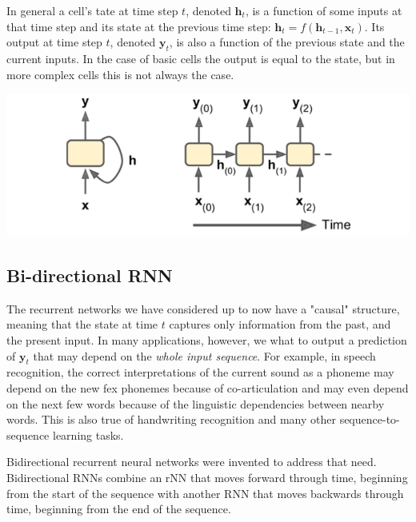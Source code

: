 \documentclass[12pt]{article}
\begin{document}
            In general a cell's tate at time step $t$, denoted $\boldsymbol{h}_t$, is a function of some inputs at that
            time step and its state at the previous time step: $\boldsymbol{h}_t = f(\boldsymbol{h}_{t-1},
            \boldsymbol{x}_t)$. Its output at time step $t$, denoted $\boldsymbol{y}_t$, is also a function of the
            previous state and the current inputs. In the case of basic cells the output is equal to the state, but in
            more complex cells this is not always the case.

            \begin{center}
                \includegraphics[scale=0.65]{MemCell}
            \end{center}
        
        \subsection{Bi-directional RNN}
            The recurrent networks we have considered up to now have a "causal" structure, meaning that the state at
            time $t$ captures only information from the past, and the present input. In many applications, however, we
            what to output a prediction of $\boldsymbol{y}_t$ that may depend on the \textit{whole input sequence}. For
            example, in speech recognition, the correct interpretations of the current sound as a phoneme may depend on
            the new fex phonemes because of co-articulation and may even depend on the next few words because of the
            linguistic dependencies between nearby words. This is also true of handwriting recognition and many other
            sequence-to-sequence learning tasks.

            Bidirectional recurrent neural networks were invented to address that need. Bidirectional RNNs combine an
            rNN that moves forward through time, beginning from the start of the sequence with another RNN that moves
            backwards through time, beginning from the end of the sequence. 
            
\end{document}

